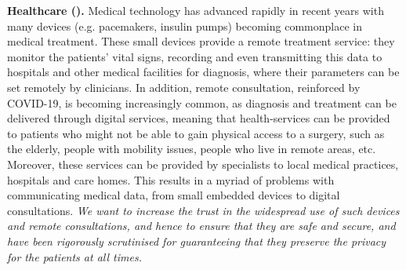 \begin{Workpackage}{\thewpno}
\begin{Task}
\textbf{Healthcare (\SOPRAshort{}).} 
Medical technology has advanced rapidly in recent years %
with many devices (e.g. pacemakers, insulin pumps) becoming commonplace in medical treatment. These small devices  provide a remote treatment service: they monitor the patients' vital signs, recording and even transmitting this data to hospitals and other medical facilities for diagnosis, where their parameters can be set remotely by clinicians.
In addition, remote consultation, reinforced by  COVID-19, is becoming increasingly common, as diagnosis and treatment can be delivered through digital services, meaning that health-services can be provided to patients who might not be able to gain physical access to a surgery, such as the elderly, people with mobility issues, people who live in remote areas, etc. Moreover, these services can be provided by specialists to local medical practices, hospitals and care homes. This results in a myriad of problems with communicating medical data, from small embedded devices to digital consultations. 
\emph{We want to increase the trust in the widespread use of such devices and remote consultations, and hence
to ensure that they are safe and secure, and have been rigorously scrutinised for guaranteeing that they preserve 
the privacy for the patients at all times.}


\end{Task}
\end{Workpackage}
